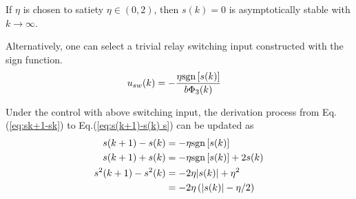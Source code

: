\documentclass[10pt,onecolumn,draftcls]{IEEEtran}
\newcommand\sgn{{\rm sgn}}
\begin{document}
	If $\eta$ is chosen to satiety $\eta\in(0,2)$, then $s(k)=0$ is asymptotically stable with $k\to\infty$. 
	
	Alternatively, one can select a trivial relay switching input constructed with the sign function.
	\begin{align}
		u_{sw}(k) &= -\frac{\eta \sgn \left[s(k)\right]}{b\Phi_3(k)}
	\end{align}

	Under the control with above switching input, the derivation process from Eq.(\ref{eq:sk+1-sk}) to Eq.(\ref{eq:s(k+1)-s(k) s}) can be updated as
	\begin{align}\begin{split}\label{eq:s(k+1)-s(k)}
		s(k+1)-s(k) &= -\eta \sgn\left[s(k)\right]\\
		s(k+1)+s(k) &= -\eta \sgn\left[s(k)\right]+2s(k)\\
		s^2(k+1)-s^2(k) &= -2\eta\vert s(k)\vert+\eta^2\\
		&=-2\eta\left(\vert s(k)\vert-\eta/2\right)
	\end{split}\end{align}
\end{document}
